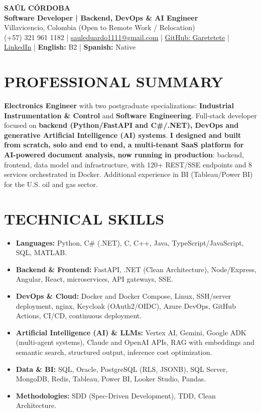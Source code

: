 \documentclass[letterpaper,10pt]{article}
\begin{document}
\begin{center}
    {\Huge \bfseries SAÚL CÓRDOBA} \\[3pt]
    {\Large \textbf{Software Developer | Backend, DevOps \& AI Engineer}} \\[2pt]
    Villavicencio, Colombia (Open to Remote Work / Relocation) \\
    (+57) 321 961 1182 | \href{mailto:sauleduardo1111@gmail.com}{sauleduardo1111@gmail.com} | \href{https://github.com/Garetetete}{GitHub: Garetetete} | \href{https://www.linkedin.com/in/saul-cordoba-a2997427b}{LinkedIn} | \textbf{English:} B2 | \textbf{Spanish:} Native
\end{center}

\section{PROFESSIONAL SUMMARY}
\textbf{Electronics Engineer} with two postgraduate specializations: \textbf{Industrial Instrumentation \& Control} and \textbf{Software Engineering}. Full-stack developer focused on \textbf{backend (Python/FastAPI and C\#/.NET), DevOps and generative Artificial Intelligence (AI) systems}. \textbf{I designed and built from scratch, solo and end to end, a multi-tenant SaaS platform for AI-powered document analysis, now running in production}: backend, frontend, data model and infrastructure, with 120+ REST/SSE endpoints and 8 services orchestrated in Docker. Additional experience in BI (Tableau/Power BI) for the U.S. oil and gas sector.

\section{TECHNICAL SKILLS}
\begin{itemize}
    \item \textbf{Languages:} Python, C\# (.NET), C, C++, Java, TypeScript/JavaScript, SQL, MATLAB.
    \item \textbf{Backend \& Frontend:} FastAPI, .NET (Clean Architecture), Node/Express, Angular, React, microservices, API gateways, SSE.
    \item \textbf{DevOps \& Cloud:} Docker and Docker Compose, Linux, SSH/server deployment, nginx, Keycloak (OAuth2/OIDC), Azure DevOps, GitHub Actions, CI/CD, continuous deployment.
    \item \textbf{Artificial Intelligence (AI) \& LLMs:} Vertex AI, Gemini, Google ADK (multi-agent systems), Claude and OpenAI APIs, RAG with embeddings and semantic search, structured output, inference cost optimization.
    \item \textbf{Data \& BI:} SQL, Oracle, PostgreSQL (RLS, JSONB), SQL Server, MongoDB, Redis, Tableau, Power BI, Looker Studio, Pandas.
    \item \textbf{Methodologies:} SDD (Spec-Driven Development), TDD, Clean Architecture.
\end{itemize}
\end{document}
